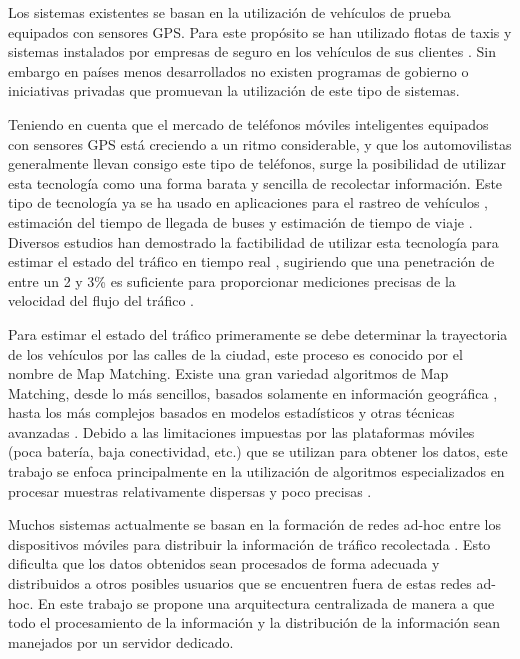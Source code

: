 Los sistemas existentes se basan en la utilización de vehículos de prueba equipados con sensores GPS. Para este propósito se han utilizado flotas de taxis \cite{schafer2002traffic,reinthaler2007evaluation} y sistemas instalados por empresas de seguro en los vehículos de sus clientes \cite{giovannini2011novel}. Sin embargo en países menos desarrollados no existen programas de gobierno o iniciativas privadas que promuevan la utilización de este tipo de sistemas.

Teniendo en cuenta que el mercado de teléfonos móviles inteligentes equipados con sensores GPS está creciendo a un ritmo considerable, y que los automovilistas generalmente llevan consigo este tipo de teléfonos, surge la posibilidad de utilizar esta tecnología como una forma barata y sencilla de recolectar información. Este tipo de tecnología ya se ha usado en aplicaciones para el rastreo de vehículos \cite{thiagarajan2010cooperative}, estimación del tiempo de llegada de buses \cite{zhou2012long} y estimación de tiempo de viaje \cite{thiagarajan2009vtrack}. Diversos estudios han demostrado la factibilidad de utilizar esta tecnología para estimar el estado del tráfico en tiempo real \cite{tao2012real,herrera2010evaluation}, sugiriendo que una penetración de entre un 2 y 3\% es suficiente para proporcionar mediciones precisas de la velocidad del flujo del tráfico \cite{herrera2010evaluation}.

Para estimar el estado del tráfico primeramente se debe determinar la trayectoria de los vehículos por las calles de la ciudad, este proceso es conocido por el nombre de Map Matching. Existe una gran variedad algoritmos de Map Matching, desde lo más sencillos, basados solamente en información geográfica \cite{white2000some}, hasta los más complejos basados en modelos estadísticos y otras técnicas avanzadas \cite{quddus2006high,kim2001adaptive}. Debido a las limitaciones impuestas por las plataformas móviles (poca batería, baja conectividad, etc.) que se utilizan para obtener los datos, este trabajo se enfoca principalmente en la utilización de algoritmos especializados en procesar muestras relativamente dispersas y poco precisas \cite{lou2009map}.

Muchos sistemas actualmente se basan en la formación de redes ad-hoc entre los dispositivos móviles para distribuir la información de tráfico recolectada \cite{zhong2008disseminating,leontiadis2011effectiveness}. Esto dificulta que los datos obtenidos sean procesados de forma adecuada y distribuidos a otros posibles usuarios que se encuentren fuera de estas redes ad-hoc. En este trabajo se propone una arquitectura centralizada de manera a que todo el procesamiento de la información y la distribución de la información sean manejados por un servidor dedicado.

